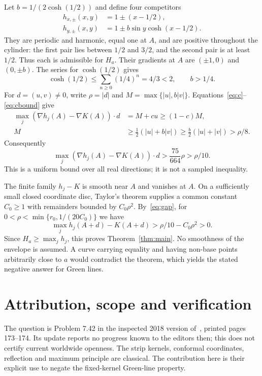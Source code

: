 \documentclass[11pt]{article}
\begin{document}
Let $b=1/(2\cosh(1/2))$ and define four competitors
\begin{align*}
 h_{x,\pm}(x,y)&=1\pm(x-1/2),\\
 h_{y,\pm}(x,y)&=1\pm b\sin y\cosh(x-1/2).
\end{align*}
They are periodic and harmonic, equal one at $A$, and are positive throughout the cylinder: the first pair lies between $1/2$ and $3/2$, and the second pair is at least $1/2$. Thus each is admissible for $H_a$. Their gradients at $A$ are $(\pm1,0)$ and $(0,\pm b)$. The series for $\cosh(1/2)$ gives
\[
 \cosh(1/2)\leq\sum_{n\geq0}(1/4)^n=4/3<2,
 \qquad b>1/4.
\]
For $d=(u,v)\ne0$, write $\rho=|d|$ and $M=\max\{|u|,b|v|\}$. Equations~\eqref{eq:c}--\eqref{eq:cbound} give
\begin{align*}
 \max_j (\nabla h_j(A)-\nabla K(A))\cdot d
 &=M+cu\geq(1-c)M,\\
 M&\geq\tfrac12(|u|+b|v|)
 \geq\tfrac b2(|u|+|v|)>\rho/8.
\end{align*}
Consequently
\begin{equation}\label{eq:gap}
 \max_j (\nabla h_j(A)-\nabla K(A))\cdot d
 >\frac{75}{664}\rho>\rho/10.
\end{equation}
This is a uniform bound over all real directions; it is not a sampled inequality.

The finite family $h_j-K$ is smooth near $A$ and vanishes at $A$. On a sufficiently small closed coordinate disc, Taylor's theorem supplies a common constant $C_0\geq1$ with remainders bounded by $C_0\rho^2$. By~\eqref{eq:gap}, for $0<\rho<\min\{r_0,1/(20C_0)\}$ we have
\[
 \max_j h_j(A+d)-K(A+d)>\rho/10-C_0\rho^2>0.
\]
Since $H_a\geq\max_jh_j$, this proves Theorem~\ref{thm:main}. No smoothness of the envelope is assumed. A curve carrying equality and having non-base points arbitrarily close to $a$ would contradict the theorem, which yields the stated negative answer for Green lines.

\section{Attribution, scope and verification}
The question is Problem 7.42 in the inspected 2018 version of~\cite{HL}, printed pages 173--174. Its update reports no progress known to the editors then; this does not certify current worldwide openness. The strip kernels, conformal coordinates, reflection and maximum principle are classical. The contribution here is their explicit use to negate the fixed-kernel Green-line property.
\end{document}
